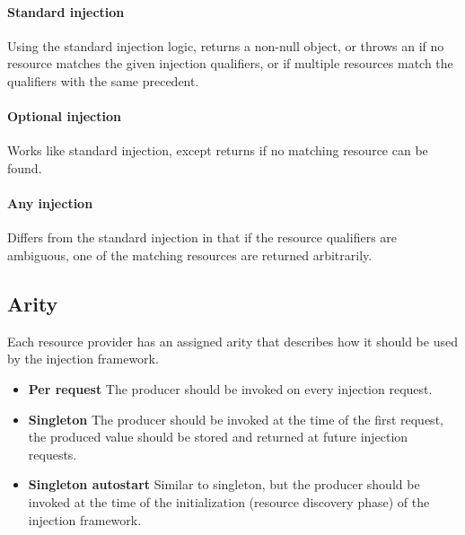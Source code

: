 			\paragraph{Standard injection}
			
			Using the standard injection logic,  returns a non-null object, or throws an  if no resource matches the given injection qualifiers, or if multiple resources match the qualifiers with the same precedent. 
		
			\paragraph{Optional injection}
			
			Works like standard injection, except returns  if no matching resource can be found.
		
			\paragraph{Any injection}
			
			Differs from the standard injection in that if the resource qualifiers are ambiguous, one of the matching resources are returned arbitrarily.
		
		\subsection*{Arity}
		
		Each resource provider has an assigned arity that describes how it should be used by the injection framework.
		
		\begin{itemize}
		
			\item{\textbf{Per request}} The producer should be invoked on every injection request.
		
			\item{\textbf{Singleton}} The producer should be invoked at the time of the first request, the produced value should be stored and returned at future injection requests.
		
			\item{\textbf{Singleton autostart}} Similar to singleton, but the producer should be invoked at the time of the initialization (resource discovery phase) of the injection framework.
		
		\end{itemize}
	
